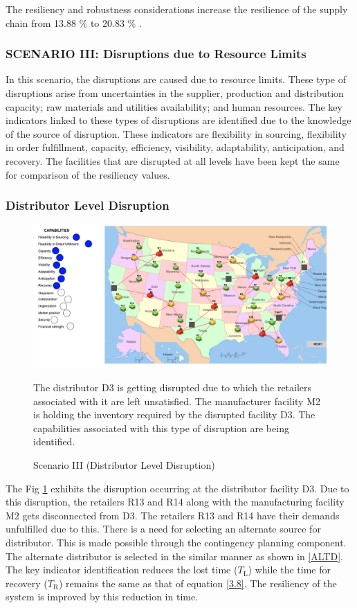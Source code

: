 The resiliency and robustness considerations increase the resilience of the supply chain from 13.88 \% to 20.83 \% .

\subsubsection{SCENARIO III: Disruptions due to Resource Limits}

In this scenario, the disruptions are caused due to resource limits. These type of disruptions arise from uncertainties in the supplier, production and distribution capacity; raw materials and utilities availability; and human resources. The key indicators linked to these types of disruptions are identified due to the knowledge of the source of disruption. These indicators are flexibility in sourcing, flexibility in order fulfillment, capacity, efficiency, visibility, adaptability, anticipation, and recovery. The facilities that are disrupted at all levels have been kept the same for comparison of the resiliency values.

\subsubsection{Distributor Level Disruption}

\begin{figure}[H]
  \centering
  \includegraphics[width=6.5in]{figures/pdf/S3DLD.png}\\
  \caption{Scenario III (Distributor Level Disruption)}
  {The distributor D3 is getting disrupted due to which the retailers associated with it are left unsatisfied. The manufacturer facility M2 is holding the inventory required by the disrupted facility D3. The capabilities associated with this type of disruption are being identified.}
  \label{S3DL}
\end{figure}   

The Fig \ref{S3DL} exhibits the disruption occurring at the distributor facility D3. Due to this disruption, the retailers R13 and R14 along with the manufacturing facility M2 gets disconnected from D3. The retailers R13 and R14 have their demands unfulfilled due to this. There is a need for selecting an alternate source for distributor. This is made possible through the contingency planning component. The alternate distributor is selected in the similar manner as shown in \ref{ALTD}. The key indicator identification reduces the lost time ($T_{\text{L}}$) while the time for recovery ($T_{\text{R}}$) remains the same as that of equation \ref{3.8}. The resiliency of the system is improved by this reduction in time.

